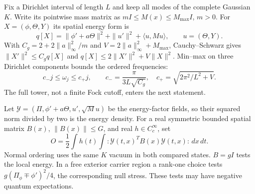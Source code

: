 Fix a Dirichlet interval of length $L$ and keep all modes of the
complete Gaussian $K$. Write its pointwise mass matrix as
$mI\le M(x)\le M_{\max}I$, $m>0$. For
$X=(\phi,\Theta,Y)$ its spatial energy form is
\[
 q[X]=\|\phi'+a\Theta\|^2+\|u'\|^2+\langle u,Mu\rangle,
 \qquad u=(\Theta,Y).
\]
With $C_g=2+2\|a\|_\infty^2/m$ and
$V=2\|a\|_\infty^2+M_{\max}$, Cauchy--Schwarz gives
$\|X'\|^2\le C_gq[X]$ and
$q[X]\le2\|X'\|^2+V\|X\|^2$.
Min--max on three Dirichlet components bounds the ordered frequencies:
\[
 c_-j\le\omega_j\le c_+j,\qquad
 c_-=\frac{\pi}{3L\sqrt{C_g}},\quad
 c_+=\sqrt{2\pi^2/L^2+V}.
\]
The full tower, not a finite Fock cutoff, enters the next statement.

Let $\mathcal Y=(\Pi,\phi'+a\Theta,u',\sqrt M u)$ be the energy-factor
fields, so their squared norm divided by two is the energy density.
For a real symmetric bounded spatial matrix $B(x)$,
$\|B(x)\|\le G$, and real $h\in C_c^\infty$, set
\[
 O=\frac12\int h(t)\int
       :\mathcal Y(t,x)^TB(x)\mathcal Y(t,x):\,dx\,dt.
\]
Normal ordering uses the same $K$ vacuum in both compared states.
$B=gI$ tests the local energy. In a free exterior carrier region a
rank-one choice tests $g(\Pi_\phi\mp\phi')^2/4$, the corresponding
null stress. These tests may have negative quantum expectations.

